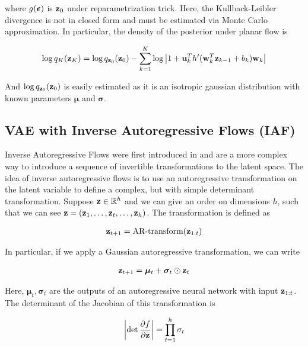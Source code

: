 \documentclass[12pt]{article}
\begin{document}
where \(g(\bm{\epsilon})\) is \(\textbf{z}_0\) under reparametrization trick. Here, the Kullback-Leibler divergence is not in closed form and must be estimated via Monte Carlo approximation. In particular, the density of the posterior under planar flow is

\begin{align}
    \log q_K(\textbf{z}_K) = \log q_{\textbf{z}_0}(\textbf{z}_0) - \sum_{k=1}^K \log \left| 1 + \mathbf{u}_k^T h'(\mathbf{w}_k^T\textbf{z}_{k-1} + b_k)\mathbf{w}_k \right|
\end{align}

And \(\log q_{\textbf{z}_0}(\textbf{z}_0)\) is easily estimated as it is an isotropic gaussian distribution with known parameters \(\boldsymbol{\mu}\) and \(\boldsymbol{\sigma}\). 

\subsection{VAE with Inverse Autoregressive Flows (IAF)}

Inverse Autoregressive Flows were first introduced in \cite{Kingma2016ImprovedVI} and are a more complex way to introduce a sequence of invertible transformations to the latent space. The idea of inverse autoregressive flows is to use an autoregressive transformation on the latent variable to define a complex, but with simple determinant transformation. Suppose \(\textbf{z} \in \mathbb{R}^h\) and we can give an order on dimensions \(h\), such that we can see \(\textbf{z} = (\textbf{z}_1,\ldots,\textbf{z}_t,\ldots,\textbf{z}_h)\). The transformation is defined as

\begin{align}
    \textbf{z}_{t+1} = \text{AR-transform}(\textbf{z}_{1:t})
\end{align}

In particular, if we apply a Gaussian autoregressive transformation, we can write

\begin{align}
    \textbf{z}_{t+1} = \boldsymbol{\mu}_t + \boldsymbol{\sigma}_t \odot \textbf{z}_t
\end{align}

Here, \(\boldsymbol{\mu}_t, \boldsymbol{\sigma}_t\) are the outputs of an autoregressive neural network with input \(\textbf{z}_{1:t}\). The determinant of the Jacobian of this transformation is

\begin{equation}
    \left| \det \frac{\partial f}{\partial \textbf{z}} \right| = \prod_{t=1}^h \sigma_t
\end{equation}
\end{document}
